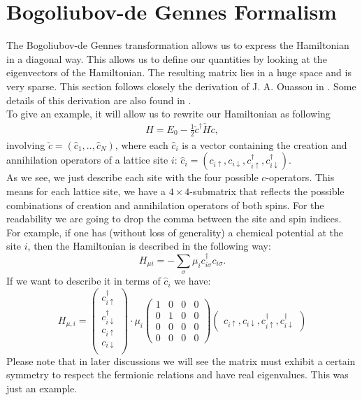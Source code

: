 \documentclass[../main.tex]{subfile}
\begin{document}
\section{Bogoliubov-de Gennes Formalism} \label{sec:BdGFormalism}
The Bogoliubov-de Gennes transformation allows us to express the Hamiltonian in a diagonal way. This allows us to 
define our quantities 
by looking at the eigenvectors of the Hamiltonian. The resulting matrix lies in a huge space and is very sparse.
This section follows closely the derivation of J. A. Ouassou in \cite{Ouassou_unpubl}. Some details of this derivation are also found in \cite{Ouassou2024}.\\

To give an example, it will allow us to rewrite our Hamiltonian as following
\begin{align}
    H = E_0 - \frac{1}{2} \check{c}^\dagger \check{H} \check{c}, \label{eq:BdG_intro_H}
\end{align}
involving $\check{c} = (\hat{c}_1,..,\hat{c}_N)$, where each $\hat{c}_i$ is a
 vector containing the creation and annihilation operators of a lattice site $i$:
$\hat{c}_i = (c_{i\uparrow} ,c_{i\downarrow}, c_{i\uparrow}^{\dagger} ,c_{i\downarrow}^{\dagger})$.\\

As we see, we just describe each site with the four possible $c$-operators. This means for each lattice site,
we have a $4\times4$-submatrix that reflects the possible combinations of creation and annihilation operators of both spins. 
For the readability we are going to drop the comma between the site and spin indices.\\
For example, if one has (without loss of generality) a chemical potential at the site $i$, 
 then the Hamiltonian is described in the following way:
\[
    H_{\mu i} = -\sum_{\sigma} \mu_i c_{i\sigma}^{\dagger} c_{i\sigma}.
\]
If we want to describe it in terms of $\hat{c}_i$ we have:
\[
    H_{\mu,i} = \begin{pmatrix}
        c_{i\uparrow}^{\dagger} \\c_{i\downarrow}^{\dagger}\\ c_{i\uparrow} \\c_{i\downarrow}\\
    \end{pmatrix}\cdot \mu_i
     \begin{pmatrix}
        1 & 0 & 0 & 0\\
        0 & 1 & 0 & 0\\
        0 & 0 & 0 & 0\\
        0 & 0 & 0 & 0
    \end{pmatrix}\begin{pmatrix}c_{i\uparrow} ,c_{i\downarrow}, c_{i\uparrow}^{\dagger} ,c_{i\downarrow}^{\dagger}\end{pmatrix}
\]
Please note that in later discussions we will see the matrix must exhibit a certain symmetry to respect the fermionic relations and have 
real eigenvalues. This was just an example.\\
\end{document}
